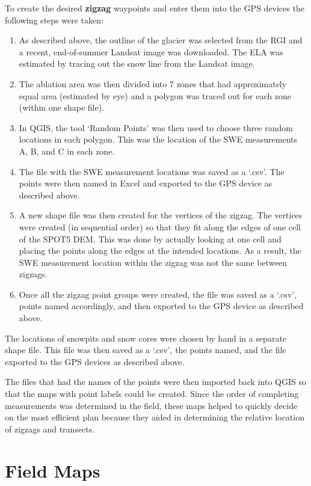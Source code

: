 \documentclass{sfuthesis}
\begin{document}
\begin{appendices}
To create the desired \textbf{zigzag} waypoints and enter them into the GPS devices the following steps were taken:
\begin{enumerate}
\item As described above, the outline of the glacier was selected from the RGI and a recent, end-of-summer Landsat image was downloaded. The ELA was estimated by tracing out the snow line from the Landsat image.
\item The ablation area was then divided into 7 zones that had approximately equal area (estimated by eye) and a polygon was traced out for each zone (within one shape file). 
\item In QGIS, the tool `Random Points' was then used to choose three random locations in each polygon. This was the location of the SWE measurements A, B, and C in each zone. 
\item The file with the SWE measurement locations was saved as a `.csv'. The points were then named in Excel and exported to the GPS device as described above.
\item A new shape file was then created for the vertices of the zigzag. The vertices were created (in sequential order) so that they fit along the edges of one cell of the SPOT5 DEM. This was done by actually looking at one cell and placing the points along the edges at the intended locations. As a result, the SWE measurement location within the zigzag was not the same between zigzags. 
\item Once all the zigzag point groups were created, the file was saved as a `.csv', points named accordingly, and then exported to the GPS device as described above. 
\end{enumerate}

The locations of snowpits and snow cores were chosen by hand in a separate shape file. This file was then saved as a `.csv', the points named, and the file exported to the GPS devices as described above. 

The files that had the names of the points were then imported back into QGIS so that the maps with point labels could be created.  Since the order of completing measurements was determined in the field, these maps helped to quickly decide on the most efficient plan because they aided in determining the relative location of zigzags and transects.



\chapter{Field Maps}



\end{appendices}
\end{document}
